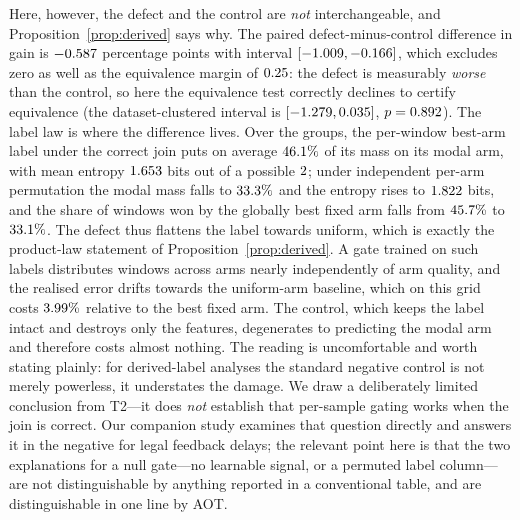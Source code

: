 \documentclass[a4paper,fleqn]{cas-sc}
\newcommand{\fitwidth}[1]{%
  \resizebox{\ifdim\width>\linewidth \linewidth\else \width\fi}{!}{#1}}
\begin{document}
Here, however, the defect and the control are \emph{not} interchangeable, and
Proposition~\ref{prop:derived} says why. The paired defect-minus-control difference
in gain is $-0.587{}$ percentage points with interval
$[-1.009{}, -0.166{}]$, which excludes zero as well as
the equivalence margin of $0.25{}$: the defect is measurably
\emph{worse} than the control, so here the equivalence test correctly declines to
certify equivalence (the dataset-clustered interval is
$[-1.279{}, 0.035{}]$,
$p = 0.892{}$). The label law is where the difference lives. Over the
\NumLabelBlocks{} groups, the per-window best-arm label under the correct join puts
on average $46.1\%$ of its mass on its modal arm, with mean
entropy $1.653{}$ bits out of a possible
$2{}$; under independent per-arm permutation the modal mass falls
to $33.3\%$ and the entropy rises to $1.822{}$
bits, and the share of windows won by the globally best fixed arm falls from
$45.7\%$ to $33.1\%$. The
defect thus flattens the label towards uniform, which is exactly the product-law
statement of Proposition~\ref{prop:derived}. A gate trained on such labels
distributes windows across arms nearly independently of arm quality, and the
realised error drifts towards the uniform-arm baseline, which on this grid costs
$3.99\%$ relative to the best fixed arm. The control,
which keeps the label intact and destroys only the features, degenerates to
predicting the modal arm and therefore costs almost nothing. The reading is
uncomfortable and worth stating plainly: for derived-label analyses the standard
negative control is not merely powerless, it understates the damage. We draw a
deliberately limited conclusion from T2---it does \emph{not} establish that
per-sample gating works when the join is correct. Our companion study
\citep{companion2026} examines that question directly and answers it in the negative
for legal feedback delays; the relevant point here is that the two explanations for
a null gate---no learnable signal, or a permuted label column---are not
distinguishable by anything reported in a conventional table, and are
distinguishable in one line by AOT.

\begin{table}[t]
\centering
\caption{T2 under the three conditions, medians over \NumTaskTwoBlocks{} groups.
Unlike T1, the \emph{defect} and \emph{control} columns are not two samples from
the same distribution: the label here is derived from all arms, so
Proposition~\ref{prop:derived} applies and the control is the milder condition.
Generated from \texttt{artifacts/t2\_selection.csv}.}
\label{tab:t2}
\fitwidth{}
\end{table}
\end{document}
